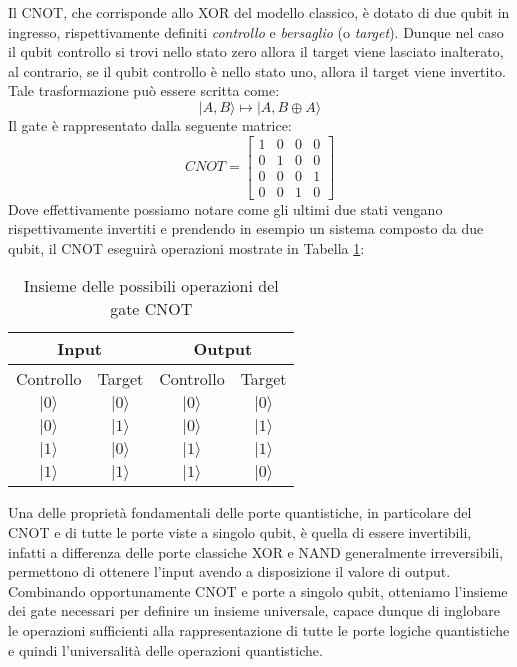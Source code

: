 Il CNOT, che corrisponde allo XOR del modello classico, è dotato di due qubit in ingresso, rispettivamente definiti \textit{controllo} e \textit{bersaglio} (o \textit{target}). Dunque nel caso il qubit controllo si trovi nello stato zero allora il target viene lasciato inalterato, al contrario, se il qubit controllo è nello stato uno, allora il target viene invertito. Tale trasformazione può essere scritta come:
\[
  | A, B \rangle \mapsto | A, B \oplus A \rangle
\]
Il gate è rappresentato dalla seguente matrice:
\[
  CNOT = 
  \begin{bmatrix}
    1 & 0 & 0 & 0 \\
    0 & 1 & 0 & 0 \\
    0 & 0 & 0 & 1 \\
    0 & 0 & 1 & 0
  \end{bmatrix}
\]
Dove effettivamente possiamo notare come gli ultimi due stati vengano rispettivamente invertiti e prendendo in esempio un sistema composto da due qubit, il CNOT eseguirà operazioni mostrate in Tabella \ref{tab:cnot}:
\begin{table}[htbp]
  \centering
  \begin{tabular}{|cc|cc|}
  \hline
  \multicolumn{2}{|c|}{Input} & \multicolumn{2}{c|}{Output} \\ \hline
  \multicolumn{1}{|c|}{Controllo} & Target & \multicolumn{1}{c|}{Controllo} & Target \\ \hline
  \multicolumn{1}{|c|}{\(|0\rangle\)} & \(|0\rangle\) & \multicolumn{1}{c|}{\(|0\rangle\)} & \(|0\rangle\) \\ \hline
  \multicolumn{1}{|c|}{\(|0\rangle\)} & \(|1\rangle\) & \multicolumn{1}{c|}{\(|0\rangle\)} & \(|1\rangle\) \\ \hline
  \multicolumn{1}{|c|}{\(|1\rangle\)} & \(|0\rangle\) & \multicolumn{1}{c|}{\(|1\rangle\)} & \(|1\rangle\) \\ \hline
  \multicolumn{1}{|c|}{\(|1\rangle\)} & \(|1\rangle\) & \multicolumn{1}{c|}{\(|1\rangle\)} & \(|0\rangle\) \\ \hline
  \end{tabular}
  \caption{Insieme delle possibili operazioni del gate CNOT}
  \label{tab:cnot}
\end{table}

Una delle proprietà fondamentali delle porte quantistiche, in particolare del CNOT e di tutte le porte viste a singolo qubit, è quella di essere invertibili, infatti a differenza delle porte classiche XOR e NAND generalmente irreversibili, permettono di ottenere l'input avendo a disposizione il valore di output. Combinando opportunamente CNOT e porte a singolo qubit, otteniamo l'insieme dei gate necessari per definire un insieme universale, capace dunque di inglobare le operazioni sufficienti alla rappresentazione di tutte le porte logiche quantistiche e quindi l'universalità delle operazioni quantistiche.

